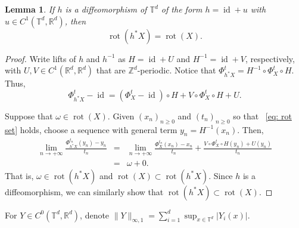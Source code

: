 \documentclass[12pt,reqno,a4paper]{amsart}%
\numberwithin{equation}{section}
\newtheorem{lemma}[theorem]{Lemma}
\newcommand{\Rr}{{\mathbb{R}}}
\newcommand{\Tt}{{\mathbb{T}}}
\newcommand{\Zz}{{\mathbb{Z}}}
\def\GL{\operatorname{GL}}
\newcommand{\id}  {\operatorname{id}}
\newcommand{\rot}{\operatorname{rot}}
\begin{document}
\begin{lemma}\label{invariant rot}
If $h$ is a diffeomorphism of $\Tt^d$ of the form $h=\id+u$ with $u\in C^1(\Tt^d, \Rr^d)$, then
$$
\rot(h^*X)=\rot(X).
$$
\end{lemma}

\begin{proof}
Write lifts of $h$ and $h^{-1}$ as $H=\id+U$ and $H^{-1}=\id+V$, respectively, with $U,V\in C^1(\Rr^d,\Rr^d)$ that are $\Zz^d$-periodic.
Notice that $\Phi^t_{h^*X}=H^{-1}\circ \Phi^t_X\circ H$.
Thus, 
$$
\Phi^t_{h^*X} -\id
= (\Phi^t_X-\id)\circ H
+V\circ \Phi^t_X \circ H
+U.
$$

Suppose that $\omega\in\rot(X)$.
Given $(x_n)_{n\geq0}$ and $(t_n)_{n\geq0}$ so that ~\eqref{eq: rot set} holds, choose a sequence with general term $y_n=H^{-1}(x_n)$.
Then,
\begin{eqnarray*}
\lim_{n\to+\infty}
\frac{\Phi^{t_n}_{h^*X}(y_n)-y_n}{t_n}
&=&
\lim_{n\to+\infty}
\frac{\Phi^{t_n}_{X}(x_n)-x_n}{t_n}
+\frac{V\circ \Phi^t_X \circ H(y_n)
+U(y_n)}{t_n} \\
&=& \omega +0.
\end{eqnarray*}
That is, $\omega\in \rot(h^* X)$ and $\rot(X)\subset \rot(h^* X)$.
Since $h$ is a diffeomorphism, we can similarly show that $\rot(h^* X)\subset  \rot(X)$.
\end{proof}

For $Y\in C^0(\Tt^d,\Rr^d)$, denote $\|Y\|_{\infty,1}=\sum_{i=1}^d\sup_{x\in\Tt^d}|Y_i(x)|$.
\end{document}
